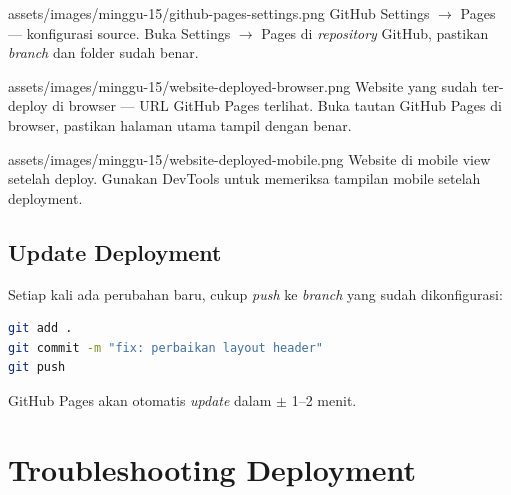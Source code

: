 \begin{tangkapanlayar}
  {assets/images/minggu-15/github-pages-settings.png}
  {GitHub Settings $\rightarrow$ Pages --- konfigurasi source.}
  {Buka Settings $\rightarrow$ Pages di \emph{repository} GitHub, pastikan \emph{branch} dan folder sudah benar.}
\end{tangkapanlayar}

\begin{tangkapanlayar}
  {assets/images/minggu-15/website-deployed-browser.png}
  {Website yang sudah ter-deploy di browser --- URL GitHub Pages terlihat.}
  {Buka tautan GitHub Pages di browser, pastikan halaman utama tampil dengan benar.}
\end{tangkapanlayar}

\begin{tangkapanlayar}
  {assets/images/minggu-15/website-deployed-mobile.png}
  {Website di mobile view setelah deploy.}
  {Gunakan DevTools untuk memeriksa tampilan mobile setelah deployment.}
\end{tangkapanlayar}

\subsection{Update Deployment}
\label{subsec:update-deploy}

Setiap kali ada perubahan baru, cukup \emph{push} ke \emph{branch} yang sudah dikonfigurasi:

\begin{lstlisting}[language=bash, caption={Push untuk update otomatis}]
git add .
git commit -m "fix: perbaikan layout header"
git push
\end{lstlisting}

GitHub Pages akan otomatis \emph{update} dalam $\pm$ 1--2 menit.

\section{Troubleshooting Deployment}
\label{sec:troubleshooting-deploy}

